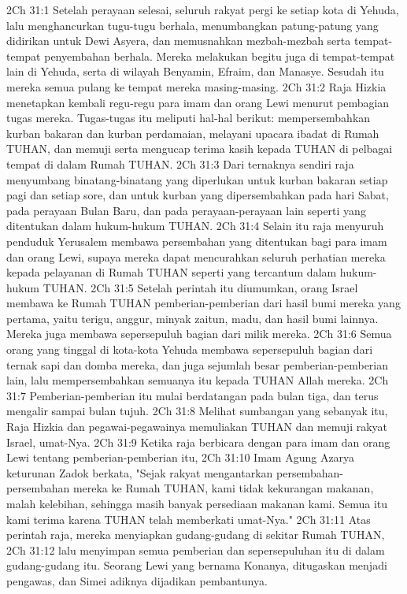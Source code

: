 2Ch 31:1  Setelah perayaan selesai, seluruh rakyat pergi ke setiap kota di Yehuda, lalu menghancurkan tugu-tugu berhala, menumbangkan patung-patung yang didirikan untuk Dewi Asyera, dan memusnahkan mezbah-mezbah serta tempat-tempat penyembahan berhala. Mereka melakukan begitu juga di tempat-tempat lain di Yehuda, serta di wilayah Benyamin, Efraim, dan Manasye. Sesudah itu mereka semua pulang ke tempat mereka masing-masing.
2Ch 31:2  Raja Hizkia menetapkan kembali regu-regu para imam dan orang Lewi menurut pembagian tugas mereka. Tugas-tugas itu meliputi hal-hal berikut: mempersembahkan kurban bakaran dan kurban perdamaian, melayani upacara ibadat di Rumah TUHAN, dan memuji serta mengucap terima kasih kepada TUHAN di pelbagai tempat di dalam Rumah TUHAN.
2Ch 31:3  Dari ternaknya sendiri raja menyumbang binatang-binatang yang diperlukan untuk kurban bakaran setiap pagi dan setiap sore, dan untuk kurban yang dipersembahkan pada hari Sabat, pada perayaan Bulan Baru, dan pada perayaan-perayaan lain seperti yang ditentukan dalam hukum-hukum TUHAN.
2Ch 31:4  Selain itu raja menyuruh penduduk Yerusalem membawa persembahan yang ditentukan bagi para imam dan orang Lewi, supaya mereka dapat mencurahkan seluruh perhatian mereka kepada pelayanan di Rumah TUHAN seperti yang tercantum dalam hukum-hukum TUHAN.
2Ch 31:5  Setelah perintah itu diumumkan, orang Israel membawa ke Rumah TUHAN pemberian-pemberian dari hasil bumi mereka yang pertama, yaitu terigu, anggur, minyak zaitun, madu, dan hasil bumi lainnya. Mereka juga membawa sepersepuluh bagian dari milik mereka.
2Ch 31:6  Semua orang yang tinggal di kota-kota Yehuda membawa sepersepuluh bagian dari ternak sapi dan domba mereka, dan juga sejumlah besar pemberian-pemberian lain, lalu mempersembahkan semuanya itu kepada TUHAN Allah mereka.
2Ch 31:7  Pemberian-pemberian itu mulai berdatangan pada bulan tiga, dan terus mengalir sampai bulan tujuh.
2Ch 31:8  Melihat sumbangan yang sebanyak itu, Raja Hizkia dan pegawai-pegawainya memuliakan TUHAN dan memuji rakyat Israel, umat-Nya.
2Ch 31:9  Ketika raja berbicara dengan para imam dan orang Lewi tentang pemberian-pemberian itu,
2Ch 31:10  Imam Agung Azarya keturunan Zadok berkata, "Sejak rakyat mengantarkan persembahan-persembahan mereka ke Rumah TUHAN, kami tidak kekurangan makanan, malah kelebihan, sehingga masih banyak persediaan makanan kami. Semua itu kami terima karena TUHAN telah memberkati umat-Nya."
2Ch 31:11  Atas perintah raja, mereka menyiapkan gudang-gudang di sekitar Rumah TUHAN,
2Ch 31:12  lalu menyimpan semua pemberian dan sepersepuluhan itu di dalam gudang-gudang itu. Seorang Lewi yang bernama Konanya, ditugaskan menjadi pengawas, dan Simei adiknya dijadikan pembantunya.
